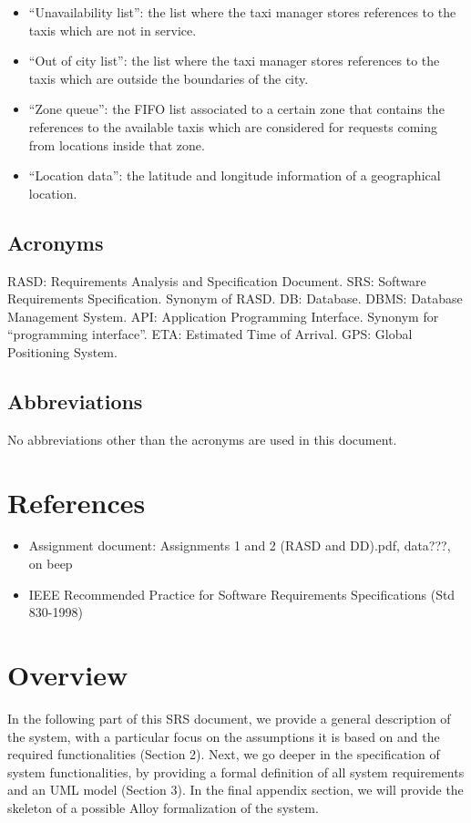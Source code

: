 \begin{itemize}
\item “Unavailability list”: the list where the taxi manager stores references to the taxis which are not in service.
\item “Out of city list”: the list where the taxi manager stores references to the taxis which are outside the boundaries of the city. 
\item “Zone queue”: the FIFO list associated to a certain zone that contains the references to the available taxis which are considered for requests coming from locations inside that zone. 
\item “Location data”: the latitude and longitude information of a geographical location.
\end{itemize}


\subsection{Acronyms}
RASD: Requirements Analysis and Specification Document.
SRS: Software Requirements Specification. Synonym of RASD.
DB: Database.
DBMS: Database Management System.
API: Application Programming Interface. Synonym for “programming interface”.
ETA: Estimated Time of Arrival.
GPS: Global Positioning System.


\subsection{Abbreviations}
No abbreviations other than the acronyms are used in this document.


\section{References}
\begin{itemize}
\item Assignment document: Assignments 1 and 2 (RASD and DD).pdf, data???, on beep
\item IEEE Recommended Practice for Software Requirements Specifications (Std 830-1998)
\end{itemize}


\section{Overview}
In the following part of this SRS document, we provide a general description of the system, with a particular focus on the assumptions it is based on and the required functionalities (Section 2). Next, we go deeper in the specification of system functionalities, by providing a formal definition of all system requirements and an UML model (Section 3).
In the final appendix section, we will provide the skeleton of a possible Alloy formalization of the system. 

